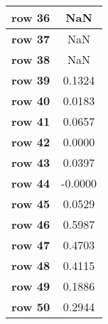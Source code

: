 \begin{tiny}
\begin{tabular}{|l|c|}
\textbf{row 36}&NaN\\\hline
\textbf{row 37}&NaN\\\hline
\textbf{row 38}&NaN\\\hline
\textbf{row 39}&0.1324\\\hline
\textbf{row 40}&0.0183\\\hline
\textbf{row 41}&0.0657\\\hline
\textbf{row 42}&0.0000\\\hline
\textbf{row 43}&0.0397\\\hline
\textbf{row 44}&-0.0000\\\hline
\textbf{row 45}&0.0529\\\hline
\textbf{row 46}&0.5987\\\hline
\textbf{row 47}&0.4703\\\hline
\textbf{row 48}&0.4115\\\hline
\textbf{row 49}&0.1886\\\hline
\textbf{row 50}&0.2944\\\hline
\end{tabular}
\end{tiny}